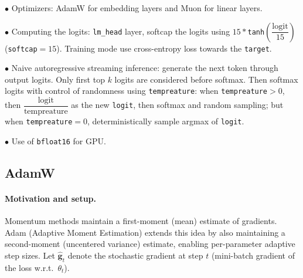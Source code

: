 $\bullet$ Optimizers: AdamW for embedding layers and Muon for linear layers.

$\bullet$ Computing the logits: \verb#lm_head# layer, softcap the logits using $15*$\verb#tanh#$\left(\dfrac{\text{logit}}{15}\right)$ (\verb#softcap#$=15$). Training mode use cross-entropy loss towards the \verb#target#.

$\bullet$ Naive autoregressive streaming inference: generate the next token through output logits. Only first top $k$ logits are considered before softmax. Then softmax logits with control of randomness using \verb#tempreature#: when \verb#tempreature#$>0$, then $\dfrac{\text{logit}}{\text{tempreature}}$ as the new \verb#logit#, then softmax and random sampling; but when \verb#tempreature#$=0$, deterministically sample argmax of \verb#logit#.

$\bullet$ Use of \verb#bfloat16# for GPU. 

\subsection{AdamW}

\paragraph{Motivation and setup.}
Momentum methods maintain a first-moment (mean) estimate of gradients. Adam (Adaptive Moment Estimation) extends this idea by also maintaining a second-moment (uncentered variance) estimate, enabling per-parameter adaptive step sizes. Let $\hat{\mathbf{g}}_t$ denote the stochastic gradient at step $t$ (mini-batch gradient of the loss w.r.t.\ $\theta_t$).

